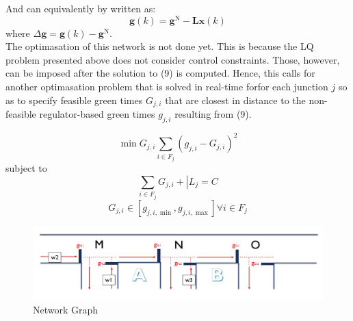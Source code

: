 \documentclass[11pt]{article}
\begin{document}
And can equivalently by written as:
\begin{equation} 
\mathbf { g } ( k ) = \mathbf { g } ^ { \mathrm { N } } - \mathbf { L } \mathbf { x } ( k )
\end{equation}
where $\Delta \mathbf {g } = \mathbf { g } ( k ) - \mathbf {g } ^ { \mathrm { N } }$.\\


The optimasation of this network is not done yet. This is because the LQ problem presented above does not consider control constraints. Those, however, can be imposed after the solution to (9) is computed. Hence, this calls for another optimasation problem that is solved in real-time forfor each junction $j$ so as to specify feasible green times $G _ { j , i }$ that are closest in distance to the non-feasible regulator-based green times $g _ { j , i }$ resulting from (9).


\begin{equation} \operatorname { min } { G _ { j , i } } \sum _ { i \in F _ { j } } \left( g _ { j , i } - G _ { j , i } \right) ^ { 2 }\end{equation} 
subject to
\begin{equation} 
\sum _ { i \in F _ { j } } G _ { j , i } + \left| L _ { j } = C \right.
\end{equation} 
\begin{equation} 
G _ { j , i } \in \left[ g _ { j , i , \min } , g _ { j , i , \max } \right] \forall i \in F _ { j }
\end{equation} 


\begin{figure}
    \caption{Network Graph}
      \centering
	\includegraphics[width=15cm]{network-graph}
\end{figure}


\end{document}
